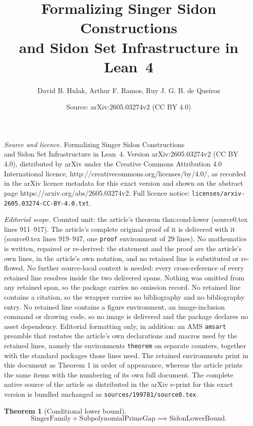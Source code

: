 \documentclass[10pt,a4paper]{amsart}
\title{Formalizing Singer Sidon Constructions\\ and Sidon Set Infrastructure in Lean~4}
\author{David B. Hulak, Arthur F. Ramos, Ruy J. G. B. de Queiroz}
\date{Source: arXiv:2605.03274v2 (CC BY 4.0)}
\newtheorem{theorem}{Theorem}
\begin{document}
\maketitle

\noindent\emph{Source and licence.} Formalizing Singer Sidon Constructions\\ and Sidon Set Infrastructure in Lean~4. Version arXiv:2605.03274v2 (CC BY 4.0), distributed by arXiv under the Creative Commons Attribution 4.0 International licence, http://creativecommons.org/licenses/by/4.0/, as recorded in the arXiv licence metadata for this exact version and shown on the abstract page https://arxiv.org/abs/2605.03274v2. Full licence notice: \texttt{licenses/arxiv-2605.03274-CC-BY-4.0.txt}.\par\smallskip

\noindent\textit{Editorial scope.} Counted unit: the article's theorem thm:cond-lower (source0.tex lines 911--917). The article's complete original proof of it is delivered with it (source0.tex lines 919--947, one \texttt{proof} environment of 29 lines). No mathematics is written, repaired or re-derived: the statement and the proof are the article's own lines, in the article's own notation, and no retained line is substituted or re-flowed.  No further source-local context is needed: every cross-reference of every retained line resolves inside the two delivered spans.  Nothing was omitted from any retained span, so the package carries no omission record.  No retained line contains a citation, so the wrapper carries no bibliography and no bibliography entry.  No retained line contains a figure environment, an image-inclusion command or drawing code, so no image is delivered and the package declares no asset dependency.  Editorial formatting only, in addition: an AMS \texttt{amsart} preamble that restates the article's own declarations and macros used by the retained lines, namely the environments \texttt{theorem} on separate counters, together with the standard packages those lines need.  The retained environments print in this document as Theorem 1 in order of appearance, whereas the article prints the same items with the numbering of its own full document.  The complete native source of the article as distributed in the arXiv e-print for this exact version is bundled unchanged as \texttt{sources/199781/source0.tex}.
\begin{theorem}[Conditional lower bound]
\label{thm:cond-lower}
\[
\mathrm{SingerFamily} + \mathrm{SubpolynomialPrimeGap}
 \implies \mathrm{SidonLowerBound}.
\]
\end{theorem}
\end{document}

